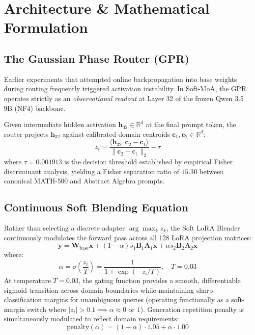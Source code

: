 \documentclass[11pt,a4paper]{article}
\begin{document}
\section{Architecture \& Mathematical Formulation}

\subsection{The Gaussian Phase Router (GPR)}

Earlier experiments that attempted online backpropagation into base weights during routing frequently triggered activation instability. In Soft-MoA, the GPR operates strictly as an \textit{observational readout} at Layer 32 of the frozen Qwen 3.5 9B (NF4) backbone.

Given intermediate hidden activation $\mathbf{h}_{32} \in \mathbb{R}^d$ at the final prompt token, the router projects $\mathbf{h}_{32}$ against calibrated domain centroids $\mathbf{c}_1, \mathbf{c}_2 \in \mathbb{R}^d$:
\begin{equation}
z_i = \frac{\langle \mathbf{h}_{32}, \mathbf{c}_2 - \mathbf{c}_1 \rangle}{\|\mathbf{c}_2 - \mathbf{c}_1\|_2} - \tau
\end{equation}
where $\tau = 0.004913$ is the decision threshold established by empirical Fisher discriminant analysis, yielding a Fisher separation ratio of $15.30$ between canonical MATH-500 and Abstract Algebra prompts.

\subsection{Continuous Soft Blending Equation}

Rather than selecting a discrete adapter $\arg\max_k z_k$, the Soft LoRA Blender continuously modulates the forward pass across all 128 LoRA projection matrices:
\begin{equation}
\mathbf{y} = \mathbf{W}_{\text{base}} \mathbf{x} + (1 - \alpha) s_1 \mathbf{B}_1 \mathbf{A}_1 \mathbf{x} + \alpha s_2 \mathbf{B}_2 \mathbf{A}_2 \mathbf{x}
\end{equation}
where:
\begin{equation}
\alpha = \sigma\left(\frac{z_i}{T}\right) = \frac{1}{1 + \exp(-z_i / T)}, \quad T = 0.03
\end{equation}
At temperature $T = 0.03$, the gating function provides a smooth, differentiable sigmoid transition across domain boundaries while maintaining sharp classification margins for unambiguous queries (operating functionally as a soft-margin switch where $|z_i| > 0.1 \implies \alpha \approx 0$ or $1$). Generation repetition penalty is simultaneously modulated to reflect domain requirements:
\begin{equation}
\text{penalty}(\alpha) = (1 - \alpha) \cdot 1.05 + \alpha \cdot 1.00
\end{equation}
\end{document}
